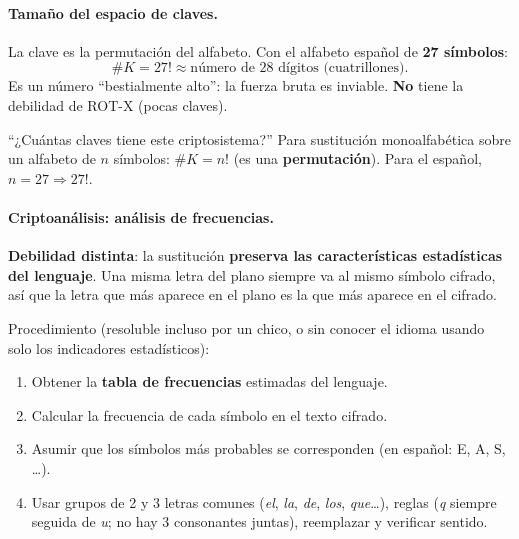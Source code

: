 \documentclass[../main.tex]{subfiles}
\begin{document}
\paragraph{Tamaño del espacio de claves.} La clave es la permutación del
alfabeto. Con el alfabeto español de \textbf{27 símbolos}:
$$\#K = 27! \approx \text{número de 28 dígitos (cuatrillones).}$$
Es un número ``bestialmente alto'': la fuerza bruta es inviable. \textbf{No}
tiene la debilidad de ROT-X (pocas claves).

\begin{examen}
``¿Cuántas claves tiene este criptosistema?'' Para sustitución monoalfabética
sobre un alfabeto de $n$ símbolos: $\#K = n!$ (es una \textbf{permutación}).
Para el español, $n=27 \Rightarrow 27!$.
\end{examen}

\paragraph{Criptoanálisis: análisis de frecuencias.}
\begin{ojo}
\textbf{Debilidad distinta}: la sustitución \textbf{preserva las características
estadísticas del lenguaje}. Una misma letra del plano siempre va al mismo
símbolo cifrado, así que la letra que más aparece en el plano es la que más
aparece en el cifrado.
\end{ojo}
Procedimiento (resoluble incluso por un chico, o sin conocer el idioma usando
solo los indicadores estadísticos):
\begin{enumerate}[nosep]
  \item Obtener la \textbf{tabla de frecuencias} estimadas del lenguaje.
  \item Calcular la frecuencia de cada símbolo en el texto cifrado.
  \item Asumir que los símbolos más probables se corresponden (en español: E,
        A, S, \dots).
  \item Usar grupos de 2 y 3 letras comunes (\emph{el}, \emph{la}, \emph{de},
        \emph{los}, \emph{que}\dots), reglas (\emph{q} siempre seguida de
        \emph{u}; no hay 3 consonantes juntas), reemplazar y verificar sentido.
\end{enumerate}
\end{document}
